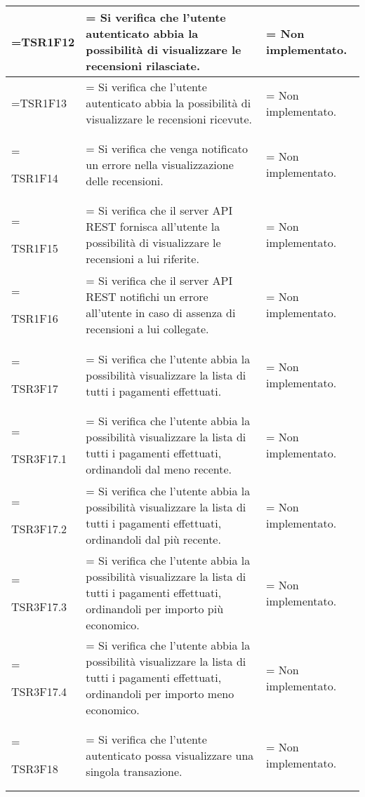 \begin{xltabular}{\textwidth} {
        >{\hsize\linewidth=\hsize}X
        >{\hsize\linewidth=\hsize}X
        >{\hsize\linewidth=\hsize}X
    }
    TSR1F12 &
    Si verifica che l'utente autenticato abbia la possibilità di visualizzare le recensioni rilasciate.  &
    Non implementato.
    \\ \hline

    TSR1F13 &
    Si verifica che l'utente autenticato abbia la possibilità di visualizzare le recensioni ricevute.  &
    Non implementato.
    \\ \hline

    TSR1F14 &
    Si verifica che venga notificato un errore nella visualizzazione delle recensioni.  &
    Non implementato.
    \\ \hline

    TSR1F15 &
    Si verifica che il server API REST fornisca all'utente la possibilità di visualizzare le recensioni a lui riferite. &
    Non implementato.
    \\ \hline

    TSR1F16 &
    Si verifica che il server API REST notifichi un errore all'utente in caso di assenza di recensioni a lui collegate. &
    Non implementato.
    \\ \hline


    TSR3F17 &
    Si verifica che l'utente abbia la possibilità visualizzare la lista di tutti i pagamenti
    effettuati. &
    Non implementato.
    \\ \hline

    TSR3F17.1 &
    Si verifica che l'utente abbia la possibilità visualizzare la lista di tutti i pagamenti
    effettuati, ordinandoli dal meno recente. &
    Non implementato.
    \\ \hline

    TSR3F17.2 &
    Si verifica che l'utente abbia la possibilità visualizzare la lista di tutti i pagamenti
    effettuati, ordinandoli dal più recente. &
    Non implementato.
    \\ \hline

    TSR3F17.3 &
    Si verifica che l'utente abbia la possibilità visualizzare la lista di tutti i pagamenti
    effettuati, ordinandoli per importo più economico. &
    Non implementato.
    \\ \hline
    
    TSR3F17.4 &
    Si verifica che l'utente abbia la possibilità visualizzare la lista di tutti i pagamenti
    effettuati, ordinandoli per importo meno economico. &
    Non implementato.
    \\ \hline

    TSR3F18 &
    Si verifica che l'utente autenticato possa visualizzare una singola transazione. &
    Non implementato.
    \\ \hline


\end{xltabular}
